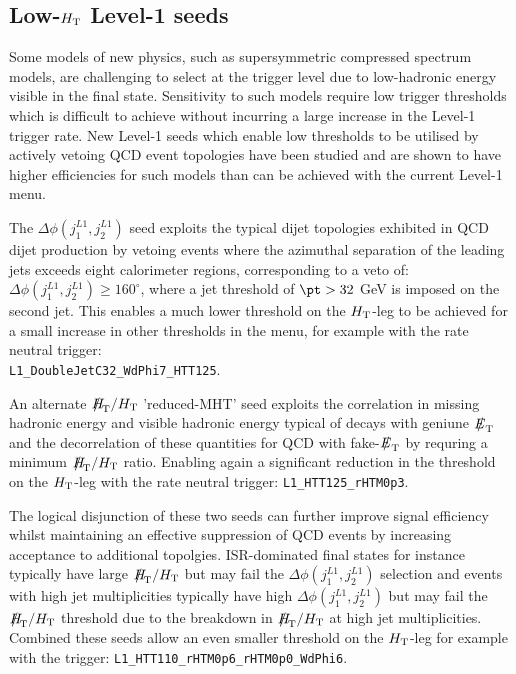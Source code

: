 \subsection{Low-$\mbox{$H_\text{T}$}$ Level-1 seeds}

Some models of new physics, such as supersymmetric compressed spectrum models, are challenging to select at the trigger level due to low-hadronic energy visible in the final state. Sensitivity to such models require low trigger thresholds which is difficult to achieve without incurring a large increase in the Level-1 trigger rate. New Level-1 seeds which enable low thresholds to be utilised by actively vetoing QCD event topologies have been studied and are shown to have higher efficiencies for such models than can be achieved with the current Level-1 menu.

The $\Delta\phi(j_{1}^{L1},j_{2}^{L1})$ seed exploits the typical dijet topologies exhibited in QCD dijet production by vetoing events where the azimuthal separation of the leading jets exceeds eight calorimeter regions, corresponding to a veto of: $\Delta\phi(j_{1}^{L1},j_{2}^{L1}) \ge 160^{\circ}$, where a jet threshold of $\pt > 32$ GeV is imposed on the second jet. This enables a much lower threshold on the $\mbox{$H_\text{T}$}$-leg to be achieved for a small increase in other thresholds in the menu, for example with the rate neutral trigger:\\ \verb!L1_DoubleJetC32_WdPhi7_HTT125!.

An alternate $\mht/\scalht$ 'reduced-MHT' seed exploits the correlation in missing hadronic energy and visible hadronic energy typical of decays with geniune $\met$ and the decorrelation of these quantities for QCD with fake-$\met$ by requring a minimum $\mht/\scalht$ ratio. Enabling again a significant reduction in the threshold on the $\mbox{$H_\text{T}$}$-leg with the rate neutral trigger: \verb!L1_HTT125_rHTM0p3!.

The logical disjunction of these two seeds can further improve signal efficiency whilst maintaining an effective suppression of QCD events by increasing acceptance to additional topolgies. ISR-dominated final states for instance typically have large $\mht/\scalht$ but may fail the $\Delta\phi(j_{1}^{L1},j_{2}^{L1})$ selection and events with high jet multiplicities typically have high $\Delta\phi(j_{1}^{L1},j_{2}^{L1})$ but may fail the $\mht/\scalht$ threshold due to the breakdown in $\mht/\scalht$ at high jet multiplicities. Combined these seeds allow an even smaller threshold on the $\mbox{$H_\text{T}$}$-leg for example with the trigger: \verb!L1_HTT110_rHTM0p6_rHTM0p0_WdPhi6!.


